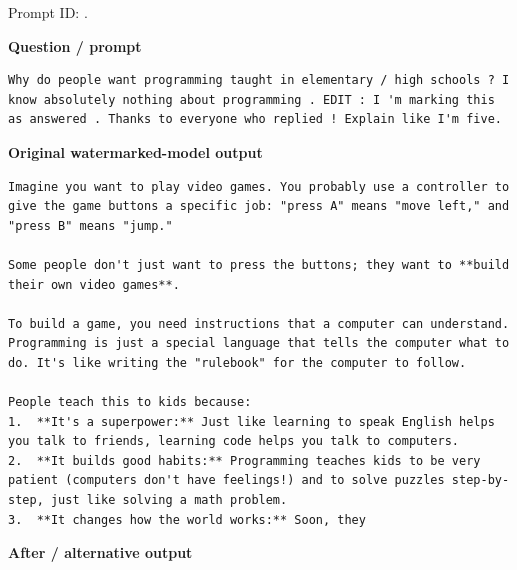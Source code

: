 Prompt ID:
\texttt{}.

\textbf{Question / prompt}

\begin{Verbatim}
Why do people want programming taught in elementary / high schools ? I know absolutely nothing about programming . EDIT : I 'm marking this as answered . Thanks to everyone who replied ! Explain like I'm five.
\end{Verbatim}

\textbf{Original watermarked-model output}

\begin{Verbatim}
Imagine you want to play video games. You probably use a controller to give the game buttons a specific job: "press A" means "move left," and "press B" means "jump."

Some people don't just want to press the buttons; they want to **build their own video games**.

To build a game, you need instructions that a computer can understand. Programming is just a special language that tells the computer what to do. It's like writing the "rulebook" for the computer to follow.

People teach this to kids because:
1.  **It's a superpower:** Just like learning to speak English helps you talk to friends, learning code helps you talk to computers.
2.  **It builds good habits:** Programming teaches kids to be very patient (computers don't have feelings!) and to solve puzzles step-by-step, just like solving a math problem.
3.  **It changes how the world works:** Soon, they
\end{Verbatim}

\textbf{After / alternative output}

